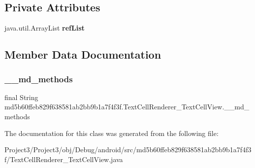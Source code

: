 \subsection*{Private Attributes}
\begin{DoxyCompactItemize}
\item 
\mbox{\label{classmd5b60ffeb829f638581ab2bb9b1a7f4f3f_1_1TextCellRenderer__TextCellView_af83f0ccc30bfc43d4b87f8e0bc0790c4}} 
java.\+util.\+Array\+List {\bfseries ref\+List}
\end{DoxyCompactItemize}


\subsection{Member Data Documentation}
\mbox{\label{classmd5b60ffeb829f638581ab2bb9b1a7f4f3f_1_1TextCellRenderer__TextCellView_a00b3617596bc3d87d289d2fa7895a853}} 
\subsubsection{\texorpdfstring{\+\_\+\+\_\+md\+\_\+methods}{\_\_md\_methods}}
{\footnotesize\ttfamily final String md5b60ffeb829f638581ab2bb9b1a7f4f3f.\+Text\+Cell\+Renderer\+\_\+\+Text\+Cell\+View.\+\_\+\+\_\+md\+\_\+methods\hspace{0.3cm}{\ttfamily [static]}}



The documentation for this class was generated from the following file\+:\begin{DoxyCompactItemize}
\item 
Project3/\+Project3/obj/\+Debug/android/src/md5b60ffeb829f638581ab2bb9b1a7f4f3f/Text\+Cell\+Renderer\+\_\+\+Text\+Cell\+View.\+java\end{DoxyCompactItemize}
